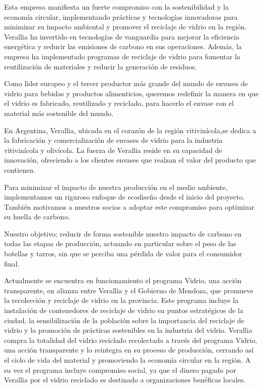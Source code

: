 \documentclass[main.tex]{subfiles}
\begin{document}
Esta empresa manifiesta un fuerte compromiso con la sostenibilidad y la economía circular, implementando prácticas y tecnologías innovadoras para minimizar su impacto ambiental y promover el reciclaje de vidrio en la región. Verallia ha invertido en tecnologías de vanguardia para mejorar la eficiencia energética y reducir las emisiones de carbono en sus operaciones. Además, la empresa ha implementado programas de reciclaje de vidrio para fomentar la reutilización de materiales y reducir la generación de residuos.

Como líder europeo y el tercer productor más grande del mundo de envases de vidrio para bebidas y productos alimenticios, queremos redefinir la manera en que el vidrio es fabricado, reutilizado y reciclado, para hacerlo el envase con el material más sostenible del mundo.

En Argentina, Verallia, ubicada en el corazón de la región vitivinícola,se dedica a la fabricación y comercialización de envases de vidrio para la industria vitivinícola y olivícola. La fuerza de Verallia reside en su capacidad de innovación, ofreciendo a los clientes envases que realzan el valor del producto que contienen.

Para minimizar el impacto de nuestra producción en el medio ambiente, implementamos un riguroso enfoque de ecodiseño desde el inicio del proyecto. También motivamos a nuestros socios a adoptar este compromiso para optimizar su huella de carbono.

Nuestro objetivo: reducir de forma sostenible nuestro impacto de carbono en todas las etapas de producción, actuando en particular sobre el peso de las botellas y tarros, sin que se perciba una pérdida de valor para el consumidor final.

Actualmente se encuentra en funcionamiento el programa Vidrio, una acción transparente, en alianza entre Verallia y el Gobierno de Mendoza, que promueve la recolección y reciclaje de vidrio en la provincia. Este programa incluye la instalación de contenedores de reciclaje de vidrio en puntos estratégicos de la ciudad, la sensibilización de la población sobre la importancia del reciclaje de vidrio y la promoción de prácticas sostenibles en la industria del vidrio. Verallia compra la totalidad del vidrio reciclado recolectado a través del programa Vidrio, una acción transparente y lo reintegra en su proceso de producción, cerrando así el ciclo de vida del material y promoviendo la economía circular en la región. A su vez el programa incluye compromiso social, ya que el dinero pagado por Verallia por el vidrio reciclado es destinado a organizaciones benéficas locales.
\end{document}
